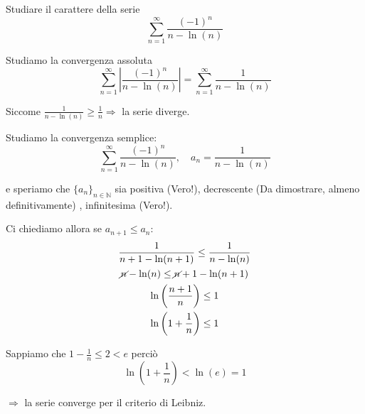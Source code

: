\begin{exbar}
	\begin{example}
			Studiare il carattere della serie
		\begin{equation*}
			\sum_{n=1}^{\infty} \frac{(-1)^n}{n-\ln(n)}
		\end{equation*}
		
		Studiamo la convergenza assoluta
		\begin{equation*}
			\sum_{n=1}^{\infty} \left| \frac{(-1)^n} {n - \ln(n)} \right| = \sum_{n=1}^{\infty} \frac{1} {n - \ln(n)}
		\end{equation*}
		
		Siccome $\frac{1} {n - \ln(n)} \geq \frac{1}{n} \Rightarrow$ la serie diverge.
		
		Studiamo la convergenza semplice:
		\begin{equation*}
			\sum_{n=1}^{\infty} \frac{(-1)^n} {n - \ln(n)}, \quad a_n = \frac{1} {n - \ln(n)}
		\end{equation*}
		
		e speriamo che $\{a_n\}_{n\in\mathbb{N}}$ sia positiva (Vero!), decrescente (Da dimostrare, almeno definitivamente) , infinitesima (Vero!).
		
		Ci chiediamo allora se $a_{n+1}\leq a_{n}$:
		\begin{gather*}
			\frac{1} {n+1 - \ln(n+1)} \leq \frac{1} {n - \ln(n)} 
			\\
			\cancel{n} - \ln(n) \leq \cancel{n} + 1 - \ln(n+1) 
			\\
			\ln \left( \frac{n+1} {n} \right) \leq 1
			\\
			\ln \left( 1 + \frac{1}{n} \right) \leq 1
		\end{gather*} 
		
		Sappiamo che $1 - \frac{1}{n} \leq 2 < e$ perciò
		\begin{equation*}
			\ln \left( 1 + \frac{1} {n} \right) < \ln(e) = 1
		\end{equation*} 
		
		$\Rightarrow$ la serie converge per il criterio di Leibniz.
	\end{example}
\end{exbar}
		
